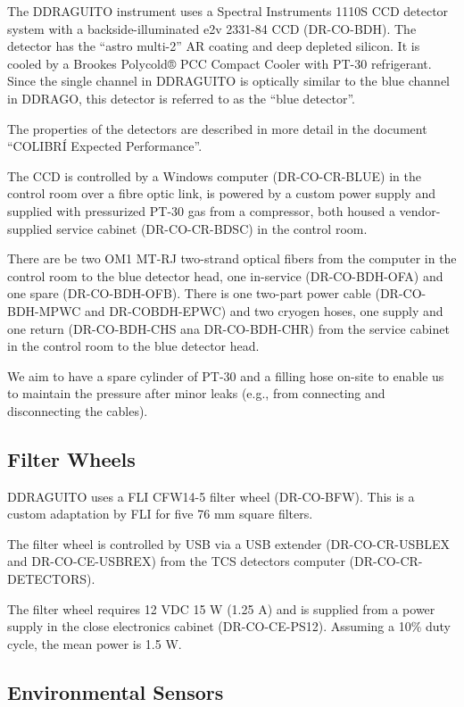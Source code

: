 \documentclass{article}
\begin{document}
The DDRAGUITO instrument uses a Spectral Instruments 1110S CCD detector system with a backside-illuminated e2v 2331-84 CCD (DR-CO-BDH). The detector has the “astro multi-2” AR coating and deep depleted silicon. It is cooled by a Brookes Polycold® PCC Compact Cooler with PT-30 refrigerant. Since the single channel in DDRAGUITO is optically similar to the blue channel in DDRAGO, this detector is referred to as the “blue detector”.

The properties of the detectors are described in more detail in the document “COLIBRÍ Expected Performance”.

The CCD is controlled by a Windows computer (DR-CO-CR-BLUE) in the control room over a fibre optic link, is powered by a custom power supply and supplied with pressurized PT-30 gas from a compressor, both housed a vendor-supplied service cabinet (DR-CO-CR-BDSC) in the control room.

There are be two OM1 MT-RJ two-strand optical fibers from the computer in the control room to the blue detector head, one in-service (DR-CO-BDH-OFA) and one spare (DR-CO-BDH-OFB). There is one two-part power cable (DR-CO-BDH-MPWC and DR-COBDH-EPWC) and two cryogen hoses, one supply and one return (DR-CO-BDH-CHS ana DR-CO-BDH-CHR) from the service cabinet in the control room to the blue detector head.

We aim to have a spare cylinder of PT-30 and a filling hose on-site to enable us to maintain the pressure after minor leaks (e.g., from connecting and disconnecting the cables).

\subsection{Filter Wheels}

DDRAGUITO uses a FLI CFW14-5 filter wheel (DR-CO-BFW). This is a custom adaptation by FLI for five 76 mm square filters.

The filter wheel is controlled by USB via a USB extender (DR-CO-CR-USBLEX and DR-CO-CE-USBREX) from the TCS detectors computer (DR-CO-CR-DETECTORS).

The filter wheel requires 12 VDC 15 W (1.25 A) and is supplied from a power supply in the close electronics cabinet (DR-CO-CE-PS12). Assuming a 10\% duty cycle, the mean power is 1.5 W.

\subsection{Environmental Sensors}
\end{document}
